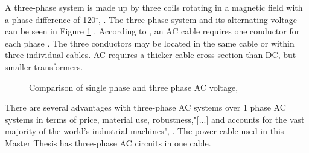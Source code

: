 \noindent A three-phase system is made up by three coils rotating in a magnetic field with a phase difference of 120$^{\circ}$, \cite{Dale2000}. The three-phase system and its alternating voltage can be seen in Figure \ref{fig:volt} . According to \cite{Beckman}, an AC cable requires one conductor for each phase . The three conductors may be located in the same cable or within three individual cables. AC requires a thicker cable cross section than DC, but smaller transformers.

\begin{figure}[H]
\hfill
{}\hfill
\caption[$\; \:$Comparison of single phase and three phase AC voltage]{Comparison of single phase and three phase AC voltage, \cite{Dale2000}}
\label{fig:volt}
\end{figure}

\noindent There are several advantages with three-phase AC systems over 1 phase AC systems in terms of price, material use, robustness,"[...] and accounts for the vast majority of the world's industrial machines", \cite{1995Tac}. The power cable used in this Master Thesis has three-phase AC circuits in one cable. 
 


